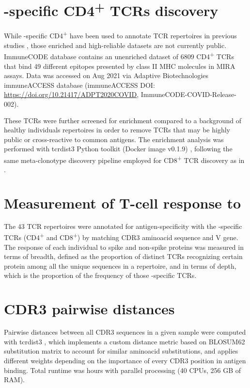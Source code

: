 \section*{\covid-specific CD4\textsuperscript{+} TCRs discovery}

While \covid-specific CD4\textsuperscript{+} have been used to annotate TCR repertoires in previous studies \cite{janssen, gittelman2021diagnosis}, those enriched and high-reliable datasets are not currently public. ImmuneCODE\texttrademark{} database contains an unenriched dataset of 6809 CD4\textsuperscript{+} TCRs that bind 49 different \covid epitopes presented by class II MHC molecules in MIRA assays. Data was accessed on Aug 2021 via Adaptive Biotechnologies immuneACCESS\textregistered{} database (immuneACCESS\textregistered{} DOI: \url{https://doi.org/10.21417/ADPT2020COVID}, ImmuneCODE-COVID-Release-002).

These TCRs were further screened for enrichment compared to a background of healthy individuals repertoires in order to remove TCRs that may be highly public or cross-reactive to common antigens. The enrichment analysis was performed with tcrdist3 Python toolkit (Docker image v0.1.9) \citep{metaclonotypes, tcrdist}, following the same meta-clonotype discovery pipeline employed for \covid{} CD8\textsuperscript{+} TCR discovery as in \cite{metaclonotypes}.

\section*{Measurement of T-cell response to \covid}

The 43 TCR repertoires were annotated for antigen-specificity with the \covid-specific TCRs (CD4\textsuperscript{+} and CD8\textsuperscript{+}) by matching CDR3 aminoacid sequence and V gene. The \covid{} response  of each individual to spike and non-spike proteins was measured in terms of breadth, defined as the proportion of distinct TCRs recognizing certain protein among all the unique sequences in a repertoire, and in terms of depth, which is the proportion of the frequency of those \covid-specific TCRs.


\section*{CDR3 pairwise distances}

Pairwise distances between all CDR3 sequences in a given sample were computed with tcrdist3 \citep{metaclonotypes, tcrdist}, which implements a custom distance metric based on BLOSUM62 substitution matrix to account for similar aminoacid substitutions, and applies different weights depending on the importance of every CDR3 position in antigen binding. Total runtime was  hours with parallel processing (40 CPUs, 256 GB of RAM).


